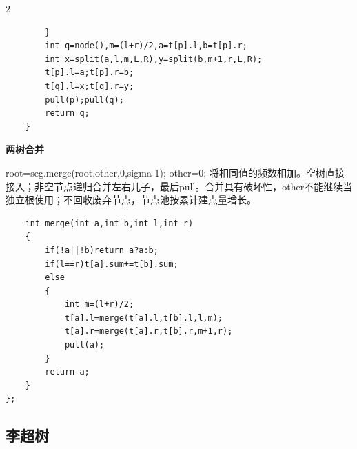 \documentclass[UTF8,fontset=fandol,a4paper,twoside]{ctexart}
\newcommand{\topic}[1]{\par\smallskip\textbf{#1}\par\nobreak}
\newcommand{\note}[1]{{\fontsize{10}{12}\selectfont #1\par}}
\begin{document}
\begin{multicols}{2}
\begin{lstlisting}
        }
        int q=node(),m=(l+r)/2,a=t[p].l,b=t[p].r;
        int x=split(a,l,m,L,R),y=split(b,m+1,r,L,R);
        t[p].l=a;t[p].r=b;
        t[q].l=x;t[q].r=y;
        pull(p);pull(q);
        return q;
    }
\end{lstlisting}
\topic{两树合并}
\note{root=\allowbreak{}seg.\allowbreak{}merge(\allowbreak{}root,\allowbreak{}other,\allowbreak{}0,\allowbreak{}sigma-\allowbreak{}1)\allowbreak{}; other=\allowbreak{}0; 将相同值的频数相加。空树直接接入；非空节点递归合并左右儿子，最后pull。合并具有破坏性，other不能继续当独立根使用；不回收废弃节点，节点池按累计建点量增长。}
\begin{lstlisting}
    int merge(int a,int b,int l,int r)
    {
        if(!a||!b)return a?a:b;
        if(l==r)t[a].sum+=t[b].sum;
        else
        {
            int m=(l+r)/2;
            t[a].l=merge(t[a].l,t[b].l,l,m);
            t[a].r=merge(t[a].r,t[b].r,m+1,r);
            pull(a);
        }
        return a;
    }
};
\end{lstlisting}
\subsection{李超树}


\end{multicols}
\end{document}

